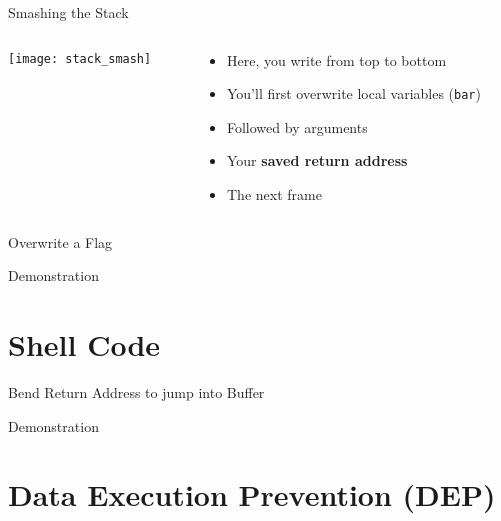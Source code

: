 \documentclass[beamer]{uibk}
\begin{document}
\begin{frame}{Smashing the Stack}
    \begin{columns}
        \begin{column}{0.5\textwidth}
            \begin{center}
                \texttt{[image: stack\_smash]}
            \end{center}
        \end{column}
        \begin{column}{0.5\textwidth}
            \begin{itemize}
                \item Here, you write from top to bottom \bigskip
                \item You'll first overwrite local variables (\texttt{bar}) \bigskip
                \item Followed by arguments \bigskip
                \item Your \textbf{saved return address} \bigskip
                \item The next frame
            \end{itemize}
        \end{column}
    \end{columns}
\end{frame}

\begin{frame}{Overwrite a Flag}
    \begin{center}
        \huge Demonstration
    \end{center}
\end{frame}

\section{Shell Code}

\begin{frame}{Bend Return Address to jump into Buffer}
    \begin{center}
        \huge Demonstration
    \end{center}
\end{frame}

\section{Data Execution Prevention (DEP)}
\end{document}
